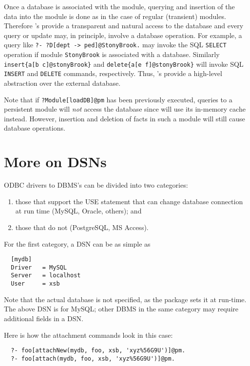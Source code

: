 Once a database is associated with the module, querying and insertion of
the data into the module is done as in the case of regular (transient)
modules.  Therefore \psm's provide a transparent and natural access to the
database and every query or update may, in principle, involve a database
operation.  For example, a query like {\tt ?- ?D[dept -> ped]@StonyBrook.}
may invoke the SQL {\tt SELECT} operation if module {\tt StonyBrook} is
associated with a database.  Similarly {\tt  insert\{a[b \fd
  c]@stonyBrook\}} and {\tt delete\{a[e \fd f]@stonyBrook\}}  will invoke
SQL {\tt INSERT} and {\tt DELETE} commands, respectively. Thus, \psm's provide
a high-level abstraction over the external database.

Note that if {\tt ?Module[loadDB]@pm} has been previously executed,
queries to a persistent module will \emph{not} access the database since
\FLSYSTEM will use its in-memory cache instead. However, insertion and
deletion of facts in such a module will still cause database operations.

\section{More on DSNs}\label{sec-dsn-more}

ODBC drivers to DBMS's can be divided into two categories:
\begin{enumerate}
\item  those that support the USE statement that can change database
  connection at run time (MySQL, Oracle, others); and
\item those that do not (PostgreSQL, MS Access).
\end{enumerate}
For the first category, a DSN can be as simple as
\begin{verbatim}
  [mydb]
  Driver   = MySQL
  Server   = localhost
  User     = xsb
\end{verbatim}
Note that the actual database 
is not specified, as the package sets it at run-time.
The above DSN is for MySQL;
other DBMS in the same category may require additional fields in a DSN.

Here is how the attachment commands look in this case:
\begin{verbatim}
  ?- foo[attachNew(mydb, foo, xsb, 'xyz%56G9U')]@pm.
  ?- foo[attach(mydb, foo, xsb, 'xyz%56G9U')]@pm.
\end{verbatim}

